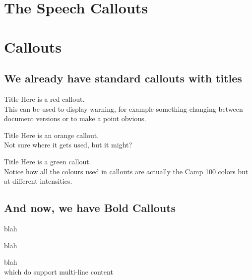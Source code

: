 \documentclass[a4paper, 11pt]{report}
\begin{document}
\makedocumenttitlepage

\chapter{The Speech Callouts}

\chapter{Callouts}
\section{We already have standard callouts with titles}
\begin{callout-red}{Title}
Here is a red callout.\\

This can be used to display warning, for example something changing between document versions or to make a point obvious.
\end{callout-red}

\begin{callout-orange}{Title}
Here is an orange callout.\\

Not sure where it gets used, but it might?
\end{callout-orange}

\begin{callout-green}{Title}
Here is a green callout.\\

Notice how all the colours used in callouts are actually the Camp 100 colors but at different intensities. 
\end{callout-green}

\section{And now, we have Bold Callouts}


\begin{callout-bold-red}
blah
\end{callout-bold-red}

\begin{callout-bold-orange}
blah
\end{callout-bold-orange}

\begin{callout-bold-green}
blah\\

which do support multi-line content
\end{callout-bold-green}

  

\makedocumentbackpage
\end{document}
